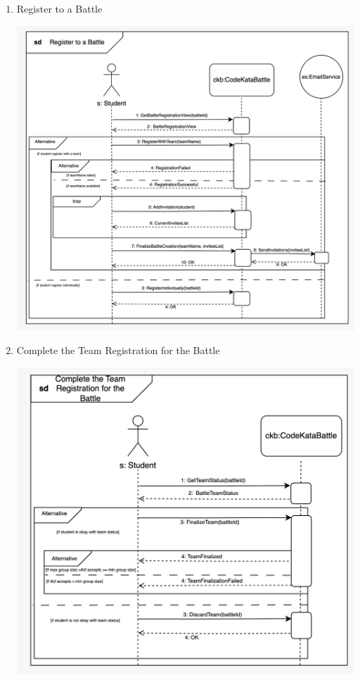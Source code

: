 \begin{enumerate}
\begin{center}
    \end{center}
    \item Register to a Battle
    \begin{center}
            \includegraphics[scale=0.2]{Images/sequence_diagrams/SD-register_to_battle.jpeg}
    \end{center}
    \newpage
    \item Complete the Team Registration for the Battle
    \begin{center}
            \includegraphics[scale=0.2]{Images/sequence_diagrams/SD-complete_team_registration_for_battle.jpeg}

\end{center}
\end{enumerate}
